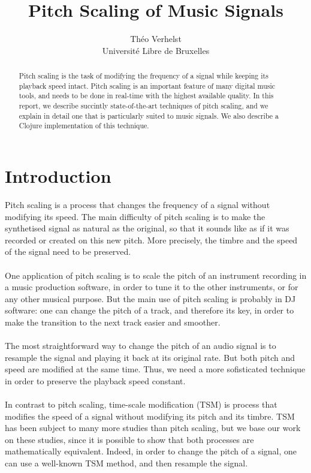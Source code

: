 \documentclass[letterpaper]{article}
\title{Pitch Scaling of Music Signals}
\author{Théo Verhelst \\
Université Libre de Bruxelles}
\begin{document}
\maketitle

\begin{abstract}
Pitch scaling is the task of modifying the frequency of a signal while keeping
its playback speed intact. Pitch scaling is an important feature of many digital
music tools, and needs to be done in real-time with the highest available
quality. In this report, we describe succintly state-of-the-art techniques of
pitch scaling, and we explain in detail one that is particularly suited to music
signals. We also describe a Clojure implementation of this technique.
\end{abstract}

\section{Introduction}
Pitch scaling is a process that changes the frequency of a signal without
modifying its speed. The main difficulty of pitch scaling is to make the
synthetised signal as natural as the original, so that it sounds like as if it
was recorded or created on this new pitch. More precisely, the timbre and the
speed of the signal need to be preserved.
\paragraph{}
One application of pitch scaling is to scale the pitch of an instrument
recording in a music production software, in order to tune it to the other
instruments, or for any other musical purpose. But the main use of pitch scaling
is probably in DJ software: one can change the pitch of a track, and therefore
its key, in order to make the transition to the next track easier and smoother.
\paragraph{}
The most straightforward way to change the pitch of an audio signal is to
resample the signal and playing it back at its original rate. But both pitch and
speed are modified at the same time. Thus, we need a more sofisticated
technique in order to preserve the playback speed constant.
\paragraph{}
In contrast to pitch scaling, time-scale modification (TSM) is process that
modifies the speed of a signal without modifying its pitch and its timbre.
TSM has been subject to many more studies than pitch scaling, but we base our
work on these studies, since it is possible to show that both processes are
mathematically equivalent. Indeed, in order to change the pitch of a signal, one
can use a well-known TSM method, and then resample the signal.
\end{document}

